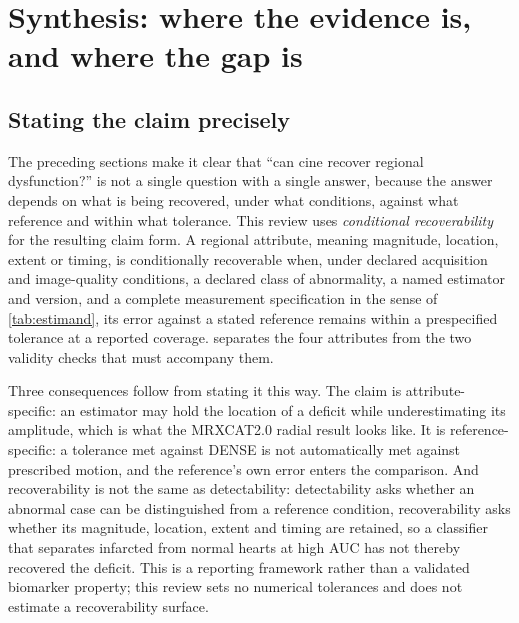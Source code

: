 \section{Synthesis: where the evidence is, and where the gap is}\label{sec:synthesis}

\subsection{Stating the claim precisely}\label{sec:recoverability}

The preceding sections make it clear that \enquote{can cine recover regional dysfunction?} is not a
single question with a single answer, because the answer depends on what is being recovered, under
what conditions, against what reference and within what tolerance. This review uses \emph{conditional
recoverability} for the resulting claim form. A regional attribute, meaning magnitude, location,
extent or timing, is conditionally recoverable when, under declared acquisition and image-quality
conditions, a declared class of abnormality, a named estimator and version, and a complete
measurement specification in the sense of \cref{tab:estimand}, its error against a stated reference
remains within a prespecified tolerance at a reported coverage.  separates the
four attributes from the two validity checks that must accompany them.

Three consequences follow from stating it this way. The claim is attribute-specific: an estimator
may hold the location of a deficit while underestimating its amplitude, which is what the MRXCAT2.0
radial result looks like. It is reference-specific: a tolerance met against DENSE is not
automatically met against prescribed motion, and the reference's own error enters the comparison. And
recoverability is not the same as detectability: detectability asks whether an abnormal case can
be distinguished from a reference condition, recoverability asks whether its magnitude, location,
extent and timing are retained, so a classifier that separates infarcted from normal hearts at high
AUC has not thereby recovered the deficit. This is a reporting framework rather than a validated
biomarker property; this review sets no numerical tolerances and does not estimate a recoverability
surface.

